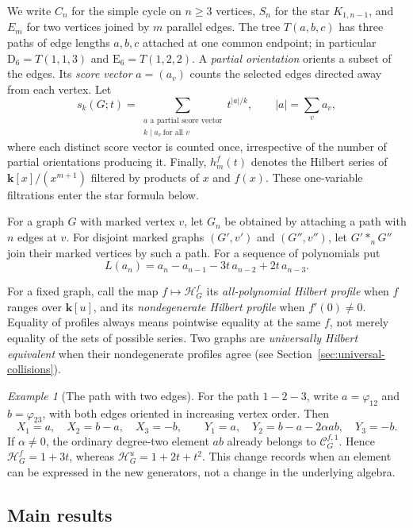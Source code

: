 \documentclass[reqno]{article}
\theoremstyle{plain} %
\theoremstyle{definition}
\theoremstyle{remark}
\newtheorem{example}[theorem]{\sc Example}
\newcommand{\K} {\mathbf{k}}
\newcommand {\CC}{\mathscr{C}}
\newcommand{\hs}{\mathscr{H}}
\numberwithin{equation}{section}
\begin{document}
We write $C_n$ for the simple cycle on $n\ge3$ vertices, $S_n$ for the
star $K_{1,n-1}$, and $E_m$ for two vertices joined by $m$ parallel edges.
The tree $T(a,b,c)$ has three paths of edge lengths $a,b,c$ attached at
one common endpoint; in particular $\mathrm D_6=T(1,1,3)$ and $\mathrm E_6=T(1,2,2)$.
A \emph{partial orientation} orients a subset of the edges. Its
\emph{score vector} $a=(a_v)$ counts the selected edges directed away
from each vertex. Let
\[
 s_k(G;t)=\sum_{\substack{a\text{ a partial score vector}\\                         k\mid a_v\ \text{for all }v}}t^{|a|/k},
 \qquad |a|=\sum_v a_v,
\]
where each distinct score vector is counted once, irrespective of the
number of partial orientations producing it. Finally, $h_m^f(t)$
denotes the Hilbert series of $\K[x]/(x^{m+1})$ filtered by products of
$x$ and $f(x)$. These one-variable filtrations enter the star formula below.

For a graph $G$ with marked vertex $v$, let $G_n$ be obtained by attaching
a path with $n$ edges at $v$. For disjoint marked graphs $(G',v')$ and
$(G'',v'')$, let $G'\ast_nG''$ join their marked vertices by such a path.
For a sequence of polynomials put
\[
 L(a_n)=a_n-a_{n-1}-3t\,a_{n-2}+2t\,a_{n-3}.
\]

For a fixed graph, call the map $f\mapsto\hs_G^f$ its
\emph{all-polynomial Hilbert profile} when $f$ ranges over $\K[u]$,
and its \emph{nondegenerate Hilbert profile} when $f'(0)\ne0$.
Equality of profiles always means pointwise equality at the same $f$,
not merely equality of the sets of possible series. Two graphs
are \emph{universally Hilbert equivalent} when their nondegenerate
profiles agree (see Section~\ref{sec:universal-collisions}).

\begin{example}[The path with two edges]\label{ex:two-edge-path}
For the path $1-2-3$, write $a=\varphi_{12}$ and $b=\varphi_{23}$,
with both edges oriented in increasing vertex order. Then
\[
 X_1=a,\quad X_2=b-a,\quad X_3=-b,\qquad
 Y_1=a,\quad Y_2=b-a-2\alpha ab,\quad Y_3=-b.
\]
If $\alpha\ne0$, the ordinary degree-two element $ab$ already belongs
to $\CC_G^{f,1}$. Hence $\hs_G^f=1+3t$, whereas
$\hs_G^u=1+2t+t^2$. This change records when an element can be expressed
in the new generators, not a change in the underlying algebra.
\end{example}

\subsection{Main results}
\end{document}
